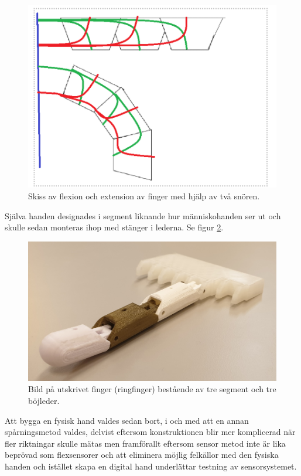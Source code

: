 \documentclass[a4paper]{article}
\begin{document}
\begin{sloppypar}
    \begin{figure}[H]
        \centering
        \includegraphics[width=.9\textwidth]{Skiss-flexion-och-extension.png}
        \caption{Skiss av flexion och extension av finger med hjälp av två snören.}
        \label{fig:flexion-extension}
    \end{figure}
    \noindent
    Själva handen designades i segment liknande hur människohanden ser ut och skulle sedan monteras ihop med stänger i lederna. Se figur \ref{fig:Ringfinger}.

    \begin{figure}[H]
        \centering
        \includegraphics[width=.9\textwidth]{finger-printad.jpg}
        \caption{Bild på utskrivet finger (ringfinger) bestående av tre segment och tre böjleder.}
        \label{fig:Ringfinger}
    \end{figure}
    \noindent
    Att bygga en fysisk hand valdes sedan bort, i och med att en annan spårningsmetod valdes, delvist eftersom konstruktionen blir mer komplicerad när fler riktningar skulle mätas
    men framförallt eftersom sensor metod inte är lika beprövad som flexsensorer och att eliminera möjlig felkällor med den fysiska handen och istället skapa en digital hand underlättar testning av sensorsystemet.


\end{sloppypar}
\end{document}
